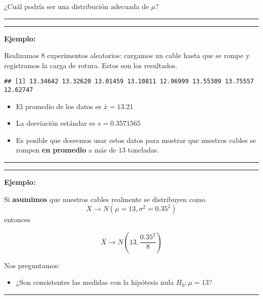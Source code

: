 \documentclass[
]{book}
\providecommand{\tightlist}{%
  \setlength{\itemsep}{0pt}\setlength{\parskip}{0pt}}
\begin{document}
¿Cuál podría ser una distribución adecuada de \(\mu\)?

\begin{center}\rule{0.5\linewidth}{0.5pt}\end{center}

\begin{center}\rule{0.5\linewidth}{0.5pt}\end{center}

\textbf{Ejemplo:}

Realizamos \(8\) experimentos aleatorios: cargamos un cable hasta que se rompe y registramos la carga de rotura. Estos son los resultados.

\begin{verbatim}
## [1] 13.34642 13.32620 13.01459 13.10811 12.96999 13.55309 13.75557 12.62747
\end{verbatim}

\begin{itemize}
\tightlist
\item
  El promedio de los datos es \(\bar{x}=13.21\)
\item
  La desviación estándar es \(s=0.3571565\)
\item
  Es posible que deseemos usar estos datos para mostrar que nuestros cables se rompen \textbf{en promedio} a más de \(13\) toneladas.
\end{itemize}

\begin{center}\rule{0.5\linewidth}{0.5pt}\end{center}

\begin{center}\rule{0.5\linewidth}{0.5pt}\end{center}

\textbf{Ejemplo:}

Si \textbf{asumimos} que nuestros cables realmente se distribuyen como \[X \rightarrow N(\mu=13, \sigma^2=0.35^2)\] entonces

\[\bar{X} \rightarrow N(13, \frac{0.35^2}{8})\]

Nos preguntamos:

\begin{itemize}
\tightlist
\item
  ¿Son consistentes las medidas con la hipótesis nula \(H_0: \mu=13\)?
\end{itemize}

\begin{center}\rule{0.5\linewidth}{0.5pt}\end{center}
\end{document}

